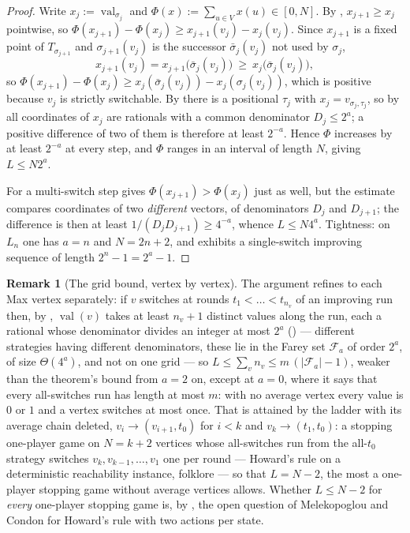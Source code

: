 \documentclass[11pt]{article}
\theoremstyle{plain}
\theoremstyle{definition}
\newtheorem{remark}[theorem]{Remark}
\DeclareMathOperator{\val}{val}
\begin{document}
\begin{proof}
Write $x_j:=\val_{\sigma_j}$ and $\Phi(x):=\sum_{u\in V}x(u)\in[0,N]$. By
, $x_{j+1}\ge x_j$ pointwise, so
$\Phi(x_{j+1})-\Phi(x_j)\ge x_{j+1}(v_j)-x_j(v_j)$. Since $x_{j+1}$ is a
fixed point of $T_{\sigma_{j+1}}$ and $\sigma_{j+1}(v_j)$ is the
successor $\bar\sigma_j(v_j)$ not used by $\sigma_j$,
\[
  x_{j+1}(v_j)=x_{j+1}\bigl(\bar\sigma_j(v_j)\bigr)\ \ge\ x_j\bigl(\bar\sigma_j(v_j)\bigr),
\]
so $\Phi(x_{j+1})-\Phi(x_j)\ge x_j(\bar\sigma_j(v_j))-x_j(\sigma_j(v_j))$,
which is positive because $v_j$ is strictly switchable. By
 there is a positional $\tau_j$ with
$x_j=v_{\sigma_j,\tau_j}$, so by  all
coordinates of $x_j$ are rationals with a common denominator
$D_j\le2^{a}$; a positive difference of two of them is therefore at least
$2^{-a}$. Hence $\Phi$ increases by at least $2^{-a}$ at every step, and
$\Phi$ ranges in an interval of length $N$, giving $L\le N2^{a}$.

For a multi-switch step  gives $\Phi(x_{j+1})>\Phi(x_j)$
just as well, but the estimate compares coordinates of two \emph{different} vectors, of denominators
$D_j$ and $D_{j+1}$; the difference is then at least
$1/(D_jD_{j+1})\ge4^{-a}$, whence $L\le N4^{a}$. Tightness: on $L_n$ one
has $a=n$ and $N=2n+2$, and  exhibits a single-switch
improving sequence of length $2^{n}-1=2^{a}-1$.
\end{proof}

\begin{remark}[The grid bound, vertex by vertex]\label{rem:grid-per-vertex}
The argument refines to each Max vertex separately: if $v$ switches at
rounds $t_1<\dots<t_{n_v}$ of an improving run then, by ,
$\val(v)$ takes at least $n_v+1$ distinct values along the run, each a
rational whose denominator divides an integer at most $2^{a}$
() --- different strategies having different
denominators, these lie in the Farey set $\mathcal F_a$ of order $2^{a}$,
of size $\Theta(4^{a})$, and not on one grid --- so
$L\le\sum_vn_v\le m\,(|\mathcal F_a|-1)$, weaker than the theorem's bound
from $a=2$ on, except at $a=0$, where it says that every all-switches run
has length at most $m$: with no average vertex every value is $0$ or $1$
and a vertex switches at most once. That is attained by the ladder with its
average chain deleted, $v_i\to(v_{i+1},t_0)$ for $i<k$ and
$v_k\to(t_1,t_0)$: a stopping one-player game on $N=k+2$ vertices whose
all-switches run from the all-$t_0$ strategy switches $v_k,v_{k-1},\dots,v_1$
one per round --- Howard's rule on a deterministic reachability instance,
folklore --- so that $L=N-2$, the most a one-player stopping game without
average vertices allows. Whether $L\le N-2$ for \emph{every} one-player
stopping game is, by , the open question of Melekopoglou
and Condon for Howard's rule with two actions per state.
\end{remark}
\end{document}
